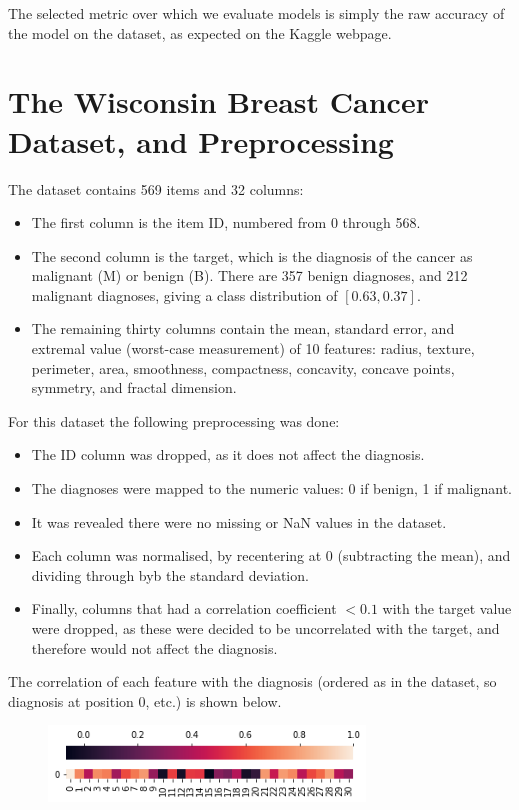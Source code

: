 \documentclass[11pt]{article}
\begin{document}
The selected metric over which we evaluate models is simply the raw accuracy of the model on the dataset, as expected on the Kaggle webpage.

\section{The Wisconsin Breast Cancer Dataset, and Preprocessing}

The dataset contains 569 items and 32 columns:
\begin{itemize}
	\item The first column is the item ID, numbered from 0 through 568. 
	\item The second column is the target, which is the diagnosis of the cancer as malignant (M) or benign (B). There are 357 benign diagnoses, and 212 malignant diagnoses, giving a class distribution of $[0.63, 0.37]$. 
	\item The remaining thirty columns contain the mean, standard error, and extremal value (worst-case measurement) of 10 features: radius, texture, perimeter, area, smoothness, compactness, concavity, concave points, symmetry, and fractal dimension. 
\end{itemize}
For this dataset the following preprocessing was done:
\begin{itemize}
	\item The ID column was dropped, as it does not affect the diagnosis. 
	\item The diagnoses were mapped to the numeric values: 0 if benign, 1 if malignant. 
	\item It was revealed there were no missing or NaN values in the dataset. 
	\item Each column was normalised, by recentering at 0 (subtracting the mean), and dividing through byb the standard deviation. 
	\item Finally, columns that had a correlation coefficient $< 0.1$ with the target value were dropped, as these were decided to be uncorrelated with the target, and therefore would not affect the diagnosis. 
\end{itemize}
The correlation of each feature with the diagnosis (ordered as in the dataset, so diagnosis at position 0, etc.) is shown below. 

\begin{figure}[htb!]
	\centering
	\includegraphics[width=0.75\textwidth]{corr}
\end{figure}
\end{document}
